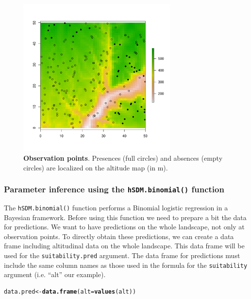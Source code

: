 \documentclass[a4paper, 12pt, leqno]{article}\usepackage[]{graphicx}\usepackage[]{color}
\makeatletter
\newcommand{\hlstd}[1]{\textcolor[rgb]{0.345,0.345,0.345}{#1}}%
\newcommand{\hlkwb}[1]{\textcolor[rgb]{0.69,0.353,0.396}{#1}}%
\newcommand{\hlkwc}[1]{\textcolor[rgb]{0.333,0.667,0.333}{#1}}%
\newcommand{\hlkwd}[1]{\textcolor[rgb]{0.737,0.353,0.396}{\textbf{#1}}}%
\newenvironment{kframe}{%
 \def\at@end@of@kframe{}%
 \ifinner\ifhmode%
  \def\at@end@of@kframe{\end{minipage}}%
  \begin{minipage}{\columnwidth}%
 \fi\fi%
 \def\FrameCommand##1{\hskip\@totalleftmargin \hskip-\fboxsep
 \colorbox{shadecolor}{##1}\hskip-\fboxsep
     \hskip-\linewidth \hskip-\@totalleftmargin \hskip\columnwidth}%
 \MakeFramed {\advance\hsize-\width
   \@totalleftmargin\z@ \linewidth\hsize
   \@setminipage}}%
 {\par\unskip\endMakeFramed%
 \at@end@of@kframe}
\newenvironment{knitrout}{}{} %
\makeatother
\begin{document}
\begin{figure} 
  \centering \includegraphics[width=8cm]{figures/observations-binomial.pdf}
  \caption{\textbf{Observation points}. Presences (full circles) and absences (empty
    circles) are localized on the altitude map (in m).}
  \label{fig:observations-binomial}
\end{figure}

\subsubsection{Parameter inference using the \texttt{hSDM.binomial()} function}

The \texttt{hSDM.binomial()} function performs a Binomial logistic regression in a
Bayesian framework. Before using this function we need to prepare a bit the data for
predictions. We want to have predictions on the whole landscape, not only at observation
points. To directly obtain these predictions, we can create a data frame including
altitudinal data on the whole landscape. This data frame will be used for the
\texttt{suitability.pred} argument. The data frame for predictions must include the same
column names as those used in the formula for the \texttt{suitability} argument
(i.e. ``alt'' our example).

\begin{knitrout}\small
{}\color{fgcolor}\begin{kframe}
\begin{alltt}
\hlstd{data.pred} \hlkwb{<-} \hlkwd{data.frame}\hlstd{(}\hlkwc{alt}\hlstd{=}\hlkwd{values}\hlstd{(alt))}
\end{alltt}
\end{kframe}
\end{knitrout}
\end{document}
